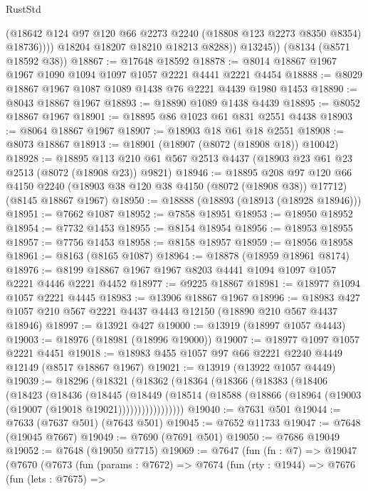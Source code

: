 \begin{lexlean}{RustStd}
\begin{coremodule}
{\begin{coremodule}
{{{{{{{{{{{{{{{{{{{{{{{{{{{{{{{{{{{{{{{{{{{{{{{{{{{{{                  (@18642 @124 @97 @120 @66 @2273 @2240 (@18808 @123 @2273 @8350 @8354) @18736))))
            @18204
            @18207
            @18210
            @18213
            @8288))
        @13245))
    (@8134 (@8571 @18592 @38))
@18867 := @17648 @18592
@18878 := @8014 @18867 @1967 @1967 @1090 @1094 @1097 @1057 @2221 @4441 @2221 @4454
@18888 := @8029 @18867 @1967 @1087 @1089 @1438 @76 @2221 @4439 @1980 @1453
@18890 := @8043 @18867 @1967
@18893 := @18890 @1089 @1438 @4439
@18895 := @8052 @18867 @1967
@18901 := @18895 @86 @1023 @61 @831 @2551 @4438
@18903 := @8064 @18867 @1967
@18907 := @18903 @18 @61 @18 @2551
@18908 := @8073 @18867
@18913 := @18901 (@18907 (@8072 (@18908 @18)) @10042)
@18928 := @18895
    @113
    @210
    @61
    @567
    @2513
    @4437
    (@18903 @23 @61 @23 @2513 (@8072 (@18908 @23)) @9821)
@18946 := @18895
    @208
    @97
    @120
    @66
    @4150
    @2240
    (@18903 @38 @120 @38 @4150 (@8072 (@18908 @38)) @17712)
    (@8145 @18867 @1967)
@18950 := @18888 (@18893 (@18913 (@18928 @18946)))
@18951 := @7662 @1087
@18952 := @7858 @18951
@18953 := @18950 @18952
@18954 := @7732 @1453
@18955 := @8154 @18954
@18956 := @18953 @18955
@18957 := @7756 @1453
@18958 := @8158 @18957
@18959 := @18956 @18958
@18961 := @8163 (@8165 @1087)
@18964 := @18878 (@18959 @18961 @8174)
@18976 := @8199 @18867 @1967 @1967 @8203 @4441 @1094 @1097 @1057 @2221 @4446 @2221 @4452
@18977 := @9225 @18867
@18981 := @18977 @1094 @1057 @2221 @4445
@18983 := @13906 @18867 @1967
@18996 := @18983 @427 @1057 @210 @567 @2221 @4437 @4443 @12150 (@18890 @210 @567 @4437 @18946)
@18997 := @13921 @427
@19000 := @13919 (@18997 @1057 @4443)
@19003 := @18976 (@18981 (@18996 @19000))
@19007 := @18977 @1097 @1057 @2221 @4451
@19018 := @18983 @455 @1057 @97 @66 @2221 @2240 @4449 @12149 (@8517 @18867 @1967)
@19021 := @13919 (@13922 @1057 @4449)
@19039 := @18296
    (@18321
      (@18362
        (@18364
          (@18366
            (@18383
              (@18406
                (@18423
                  (@18436
                    (@18445
                      (@18449
                        (@18514
                          (@18588 (@18866 (@18964 (@19003 (@19007 (@19018 @19021)))))))))))))))))
@19040 := @7631 @501
@19044 := @7633 (@7637 @501) (@7643 @501)
@19045 := @7652 @11733
@19047 := @7648 (@19045 @7667)
@19049 := @7690 (@7691 @501)
@19050 := @7686 @19049
@19052 := @7648 (@19050 @7715)
@19069 := @7647
    (fun (fn : @7) =>
    @19047
      (@7670
        (@7673
          (fun (params : @7672) =>
          @7674
            (fun (rty : @1944) =>
            @7676
              (fun (lets : @7675) =>
}}}}}}}}}}}}}}}}}}}}}}}}}}}}}}}}}}}}}}}}}}}}}}}}}}}}}
\end{coremodule}}
\end{coremodule}
\end{lexlean}

